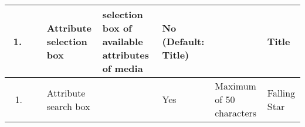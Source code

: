 \documentclass[../UseCaseSpecification.tex]{subfiles}
\begin{document}
\begin{enumerate}
\begin{flushleft}
\begin{supertabular}{|m{0.744cm}|m{2.181cm}|m{2.165cm}|m{2.052cm}|m{3.5939999cm}|m{4.086cm}|}
            \begin{enumerate}
                \item ~
            \end{enumerate} &
            Attribute selection box &
            selection box of available attributes of media &
            No (Default: Title) &
            ~ &
            Title \\
            \hline

            \begin{enumerate}
                \item ~
            \end{enumerate} &
            Attribute search box &
            ~ &
            Yes &
            Maximum of 50 characters &
            Falling Star \\
            \hline
            
        \end{supertabular}
    \end{flushleft}


\end{enumerate}
\end{document}
